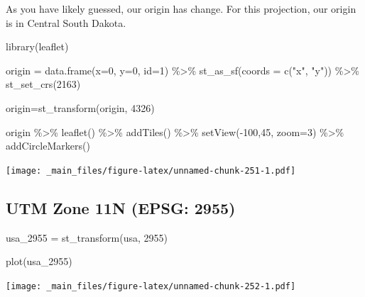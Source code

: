 \documentclass[
]{book}
\newenvironment{Shaded}{\begin{snugshade}}{\end{snugshade}}
\newcommand{\AttributeTok}[1]{\textcolor[rgb]{0.77,0.63,0.00}{#1}}
\newcommand{\DecValTok}[1]{\textcolor[rgb]{0.00,0.00,0.81}{#1}}
\newcommand{\FunctionTok}[1]{\textcolor[rgb]{0.00,0.00,0.00}{#1}}
\newcommand{\NormalTok}[1]{#1}
\newcommand{\OtherTok}[1]{\textcolor[rgb]{0.56,0.35,0.01}{#1}}
\newcommand{\SpecialCharTok}[1]{\textcolor[rgb]{0.00,0.00,0.00}{#1}}
\newcommand{\StringTok}[1]{\textcolor[rgb]{0.31,0.60,0.02}{#1}}
\begin{document}
As you have likely guessed, our origin has change. For this projection, our origin is in Central South Dakota.

\begin{Shaded}
\begin{Highlighting}[]
\FunctionTok{library}\NormalTok{(leaflet)}

\NormalTok{origin }\OtherTok{=} \FunctionTok{data.frame}\NormalTok{(}\AttributeTok{x=}\DecValTok{0}\NormalTok{, }\AttributeTok{y=}\DecValTok{0}\NormalTok{, }\AttributeTok{id=}\DecValTok{1}\NormalTok{) }\SpecialCharTok{\%\textgreater{}\%}
  \FunctionTok{st\_as\_sf}\NormalTok{(}\AttributeTok{coords =} \FunctionTok{c}\NormalTok{(}\StringTok{"x"}\NormalTok{, }\StringTok{"y"}\NormalTok{)) }\SpecialCharTok{\%\textgreater{}\%}
  \FunctionTok{st\_set\_crs}\NormalTok{(}\DecValTok{2163}\NormalTok{)}

\NormalTok{origin}\OtherTok{=}\FunctionTok{st\_transform}\NormalTok{(origin, }\DecValTok{4326}\NormalTok{)}
  
\NormalTok{origin }\SpecialCharTok{\%\textgreater{}\%} 
  \FunctionTok{leaflet}\NormalTok{() }\SpecialCharTok{\%\textgreater{}\%}
  \FunctionTok{addTiles}\NormalTok{() }\SpecialCharTok{\%\textgreater{}\%}
  \FunctionTok{setView}\NormalTok{(}\SpecialCharTok{{-}}\DecValTok{100}\NormalTok{,}\DecValTok{45}\NormalTok{, }\AttributeTok{zoom=}\DecValTok{3}\NormalTok{) }\SpecialCharTok{\%\textgreater{}\%}
  \FunctionTok{addCircleMarkers}\NormalTok{() }
\end{Highlighting}
\end{Shaded}

\texttt{[image: \_main\_files/figure-latex/unnamed-chunk-251-1.pdf]}

\hypertarget{utm-zone-11n-epsg-2955}{%
\subsection{UTM Zone 11N (EPSG: 2955)}\label{utm-zone-11n-epsg-2955}}

\begin{Shaded}
\begin{Highlighting}[]
\NormalTok{usa\_2955 }\OtherTok{=} \FunctionTok{st\_transform}\NormalTok{(usa, }\DecValTok{2955}\NormalTok{)}

\FunctionTok{plot}\NormalTok{(usa\_2955)}
\end{Highlighting}
\end{Shaded}

\texttt{[image: \_main\_files/figure-latex/unnamed-chunk-252-1.pdf]}
\end{document}

